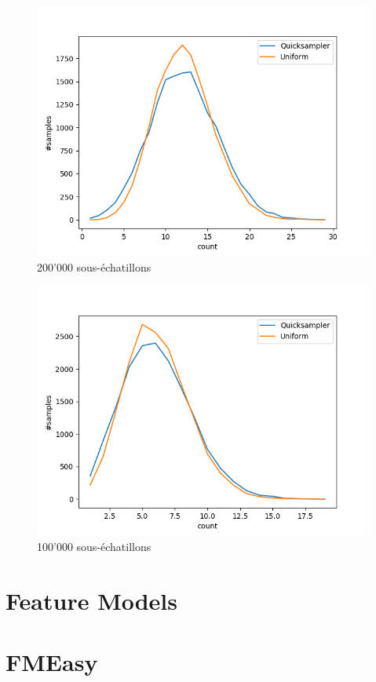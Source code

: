 \documentclass{article}
\begin{document}
\begin{figure}[!h]
    \includegraphics[scale=0.7]{DistributionFigures/Figure_case_110_200K.png}
    \caption{200'000 sous-échatillons}
\end{figure}
\begin{figure}[!h]
    \includegraphics[scale=0.7]{DistributionFigures/Figure_case_110_100K.png}
    \caption{100'000 sous-échatillons}
\end{figure}

\clearpage

\section{Feature Models}

\hspace{-3cm}
\resizebox{18cm}{!}{

}

\section{FMEasy}

\hspace{-3cm}
\resizebox{18cm}{!}{

}
\end{document}

